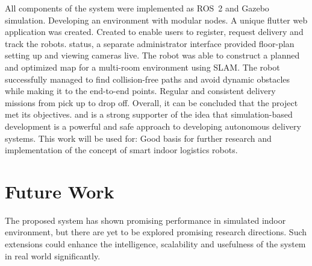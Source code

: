 All components of the system were implemented as ROS~2 and Gazebo simulation. Developing an environment with modular nodes. A unique flutter web application was created. Created to enable users to register, request delivery and track the robots. status, a separate administrator interface provided floor-plan setting up and viewing cameras live. The robot was able to construct a planned and optimized map for a multi-room environment using SLAM. The robot successfully managed to find collision-free paths and avoid dynamic obstacles while making it to the end-to-end points. Regular and consistent delivery missions from pick up to drop off. Overall, it can be concluded that the project met its objectives. and is a strong supporter of the idea that simulation-based development is a powerful and safe approach to developing autonomous delivery systems. This work will be used for: Good basis for further research and implementation of the concept of smart indoor logistics robots.

\section{Future Work}

The proposed system has shown promising performance in simulated indoor environment, but there are yet to be explored promising research directions. Such extensions could enhance the intelligence, scalability and usefulness of the system in real world significantly.


